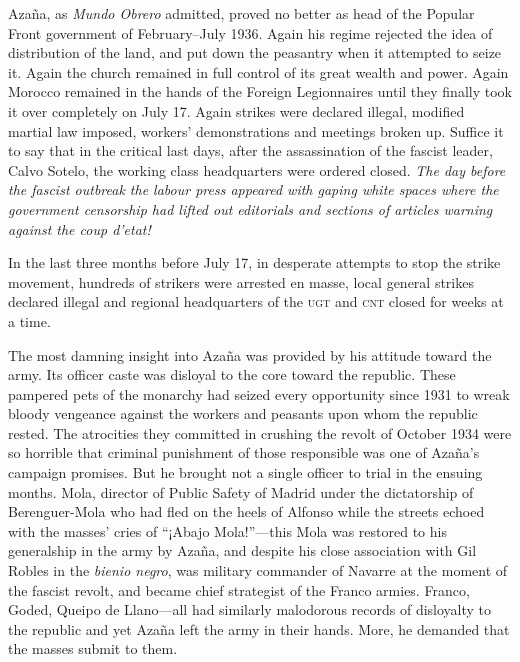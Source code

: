 Azaña, as \emph{Mundo Obrero} admitted, proved no better as head of the Popular Front government of February--July 1936. Again his regime rejected the idea of distribution of the land, and put down the peasantry when it attempted to seize it. Again the church remained in full control of its great wealth and power. Again Morocco remained in the hands of the Foreign Legionnaires until they finally took it over completely on July 17. Again strikes were declared illegal, modified martial law imposed, workers’ demonstrations and meetings broken up. Suffice it to say that in the critical last days, after the assassination of the fascist leader, Calvo Sotelo, the working class headquarters were ordered closed. \emph{The day before the fascist outbreak the labour press appeared with gaping white spaces where the government censorship had lifted out editorials and sections of articles warning against the \emph{coup d’etat}!}

In the last three months before July 17, in desperate attempts to stop the strike movement, hundreds of strikers were arrested en masse, local general strikes declared illegal and regional headquarters of the \textsc{ugt} and \textsc{cnt} closed for weeks at a time.

The most damning insight into Azaña was provided by his attitude toward the army. Its officer caste was disloyal to the core toward the republic. These pampered pets of the monarchy had seized every opportunity since 1931 to wreak bloody vengeance against the workers and peasants upon whom the republic rested. The atrocities they committed in crushing the revolt of October 1934 were so horrible that criminal punishment of those responsible was one of Azaña’s campaign promises. But he brought not a single officer to trial in the ensuing months. Mola, director of Public Safety of Madrid under the dictatorship of Berenguer-Mola who had fled on the heels of Alfonso while the streets echoed with the masses’ cries of ``¡Abajo Mola!''---this Mola was restored to his generalship in the army by Azaña, and despite his close association with Gil Robles in the \emph{bienio negro}, was military commander of Navarre at the moment of the fascist revolt, and became chief strategist of the Franco armies. Franco, Goded, Queipo de Llano---all had similarly malodorous records of disloyalty to the republic and yet Azaña left the army in their hands. More, he demanded that the masses submit to them.

